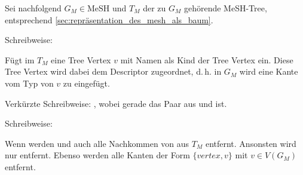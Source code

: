 Sei nachfolgend $G_M \in \textrm{MeSH}$ und $T_M$ der zu $G_M$ gehörende MeSH-Tree, entsprechend \autoref{sec:repräsentation_des_mesh_als_baum}.\par


\begin{definition}

Schreibweise:  \par

Fügt im $T_M$ eine Tree Vertex $v$ mit Namen  als Kind der Tree Vertex  ein. Diese Tree Vertex wird dabei dem Descriptor  zugeordnet, d.\,h. in $G_M$ wird eine Kante vom Typ  von $v$ zu  eingefügt. \par

Verkürzte Schreibweise: , wobei  gerade das Paar aus  und  ist.
\end{definition}

\begin{definition}
Schreibweise:  \par
Wenn  werden  und auch alle Nachkommen von  aus $T_M$ entfernt. Ansonsten wird nur  entfernt. Ebenso werden alle Kanten der Form $\{vertex,v\}$ mit $v \in V(G_M)$ entfernt.

\end{definition}

